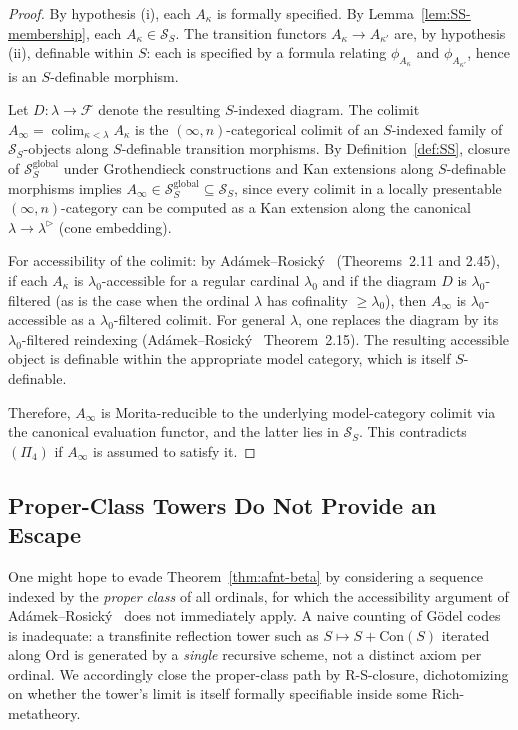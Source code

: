 \documentclass[11pt]{article}
\theoremstyle{plain}
\theoremstyle{definition}
\newcommand{\cS}{\mathcal{S}}
\newcommand{\cF}{\mathcal{F}}
\newcommand{\Con}{\mathrm{Con}}
\DeclareMathOperator{\colim}{colim}
\begin{document}
\begin{proof}
By hypothesis (i), each $A_\kappa$ is formally specified. By Lemma~\ref{lem:SS-membership}, each $A_\kappa \in \cS_S$. The transition functors $A_\kappa \to A_{\kappa'}$ are, by hypothesis (ii), definable within $S$: each is specified by a formula relating $\phi_{A_\kappa}$ and $\phi_{A_{\kappa'}}$, hence is an $S$-definable morphism.

Let $D : \lambda \to \cF$ denote the resulting $S$-indexed diagram. The colimit $A_\infty = \colim_{\kappa < \lambda} A_\kappa$ is the $(\infty, n)$-categorical colimit of an $S$-indexed family of $\cS_S$-objects along $S$-definable transition morphisms. By Definition~\ref{def:SS}, closure of $\cS_S^{\mathrm{global}}$ under Grothendieck constructions and Kan extensions along $S$-definable morphisms implies $A_\infty \in \cS_S^{\mathrm{global}} \subseteq \cS_S$, since every colimit in a locally presentable $(\infty, n)$-category can be computed as a Kan extension along the canonical $\lambda \to \lambda^\rhd$ (cone embedding).

For accessibility of the colimit: by Ad\'amek--Rosick\'y~\cite{AdamekRosicky1994} (Theorems~2.11 and 2.45), if each $A_\kappa$ is $\lambda_0$-accessible for a regular cardinal $\lambda_0$ and if the diagram $D$ is $\lambda_0$-filtered (as is the case when the ordinal $\lambda$ has cofinality $\geq \lambda_0$), then $A_\infty$ is $\lambda_0$-accessible as a $\lambda_0$-filtered colimit. For general $\lambda$, one replaces the diagram by its $\lambda_0$-filtered reindexing (Ad\'amek--Rosick\'y~\cite{AdamekRosicky1994} Theorem~2.15). The resulting accessible object is definable within the appropriate model category, which is itself $S$-definable.

Therefore, $A_\infty$ is Morita-reducible to the underlying model-category colimit via the canonical evaluation functor, and the latter lies in $\cS_S$. This contradicts $(\Pi_4)$ if $A_\infty$ is assumed to satisfy it.
\end{proof}

\subsection{Proper-Class Towers Do Not Provide an Escape}

One might hope to evade Theorem~\ref{thm:afnt-beta} by considering a sequence indexed by the \emph{proper class} of all ordinals, for which the accessibility argument of Ad\'amek--Rosick\'y~\cite{AdamekRosicky1994} does not immediately apply. A naive counting of G\"odel codes is inadequate: a transfinite reflection tower such as $S \mapsto S + \Con(S)$ iterated along $\mathrm{Ord}$ is generated by a \emph{single} recursive scheme, not a distinct axiom per ordinal. We accordingly close the proper-class path by R-S-closure, dichotomizing on whether the tower's limit is itself formally specifiable inside some Rich-metatheory.
\end{document}

